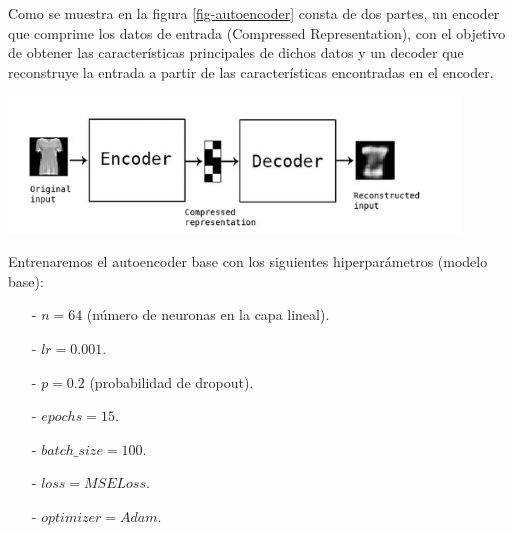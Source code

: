 \documentclass[aps,prl,reprint,groupedaddress]{revtex4-2}
\newenvironment{Figura}
  {\par\medskip\noindent\minipage{\linewidth}}
  {\endminipage\par\medskip}
\begin{document}
Como se muestra en la figura \ref{fig-autoencoder} consta de dos partes, un 
encoder que comprime los datos de entrada (Compressed Representation), con el 
objetivo de obtener las características principales de dichos datos y un 
decoder que reconstruye la entrada a partir de las características encontradas 
en el encoder.
\begin{Figura}
  \centering
  \includegraphics[width=0.90\textwidth]{figs/ejem_encoder_decoder.png}
  \label{fig-autoencoder}
\end{Figura}

Entrenaremos el autoencoder base con los siguientes hiperparámetros (modelo 
base):
\begin{itemize}
  \item [-] $n = 64$ (número de neuronas en la capa lineal).
  \item [-] $lr = 0.001$.
  \item [-] $p = 0.2$ (probabilidad de dropout).
  \item [-] $epochs = 15$.
  \item [-] $batch\_size = 100$.
  \item [-] $loss = MSELoss$.
  \item [-] $optimizer = Adam$.
\end{itemize}
\end{document}
